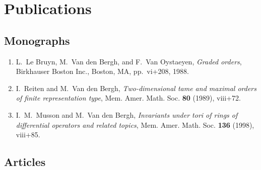 
\section*{Publications}
\subsection*{Monographs}

\begin{enumerate}

\item
L.~Le Bruyn, M.~Van den Bergh, and F.~Van Oystaeyen, {\em Graded orders}, Birkhauser Boston Inc., Boston, MA, pp.~vi+208, 1988.

\item
I.~Reiten and M.~Van den Bergh, {\em Two-dimensional tame and maximal orders of finite representation type}, Mem. Amer. Math. Soc. {\bf 80} (1989), viii+72.

\item
I.~M.~Musson and M.~Van den Bergh, {\em Invariants under tori of rings of differential operators and related topics}, Mem. Amer. Math. Soc. {\bf 136} (1998), viii+85.

\end{enumerate}


\subsection*{Articles}

